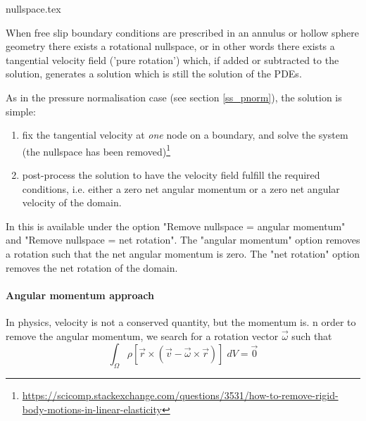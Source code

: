 \begin{flushright} {\tiny {\color{gray} nullspace.tex}} \end{flushright}

When free slip boundary conditions are prescribed in an annulus or
hollow sphere geometry there exists a rotational nullspace, or in other words there exists
a tangential velocity field ('pure rotation') which, 
if added or subtracted to the solution, generates a solution which is still the solution of the PDEs. 

As in the pressure normalisation case (see section \ref{ss_pnorm}), the solution is simple:
\begin{enumerate}
\item fix the tangential velocity at {\it one} node on a boundary, and solve the system (the nullspace 
has been removed)\footnote{\url{https://scicomp.stackexchange.com/questions/3531/how-to-remove-rigid-body-motions-in-linear-elasticity}}
\item post-process the solution to have the velocity field fulfill the required conditions, i.e.
either a zero net angular momentum or a zero net angular velocity of the domain. 
\end{enumerate}

\begin{remark}
In \aspect{} this is available under the option 
"Remove nullspace = angular momentum" and "Remove nullspace = net rotation".
The "angular momentum" option removes a rotation such that the net angular momentum is zero.
The "net rotation" option removes the net rotation of the domain.
\end{remark}

\paragraph{Angular momentum approach}

In physics, velocity is not a conserved quantity, but the momentum is. 
n order to remove the angular momentum, we search for a rotation
vector ${\vec \omega}$ such that
\begin{equation}
\int_\Omega \rho[{\vec r} \times ({\vec v}-{\vec \omega} \times {\vec r})] \; dV= \vec 0
\end{equation}


